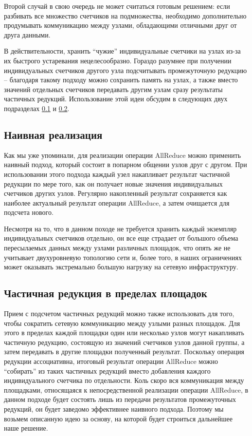 \documentclass{article}
\theoremstyle{plain}
\theoremstyle{plain}
\theoremstyle{plain}
\theoremstyle{plain}
\theoremstyle{definition}
\theoremstyle{remark}
\theoremstyle{plain}
\begin{document}
Второй случай в свою очередь не может считаться готовым решением: если разбивать все множество счетчиков на подмножества, необходимо дополнительно продумывать коммуникацию между узлами, обладающими отличными друг от друга данными.

В действительности, хранить \enquote{чужие} индивидуальные счетчики на узлах из-за их быстрого устаревания нецелесообразно. Гораздо разумнее при получении индивидуальных счетчиков другого узла подсчитывать промежуточную редукцию -- благодаря такому подходу можно сохранить память на узлах, а также вместо значений отдельных счетчиков передавать другим узлам сразу результаты частичных редукций. Использование этой идеи обсудим в следующих двух подразделах \ref{NaiveImplementationSubsection} и \ref{GroupReductionSubsection}.

\subsection{Наивная реализация}
\label{NaiveImplementationSubsection}

Как мы уже упоминали, для реализации операции AllReduce можно применить наивный подход, который состоит в попарном общении узлов друг с другом. При использовании этого подхода каждый узел накапливает результат частичной редукции по мере того, как он получает новые значения индивидуальных счетчиков других узлов. Регулярно накопленный результат сохраняется как наиболее актуальный результат операции AllReduce, а затем очищается для подсчета нового.

Несмотря на то, что в данном походе не требуется хранить каждый экземпляр индивидуальных счетчиков отдельно, он все еще страдает от большого объема пересылаемых данных между узлами различных площадок, что опять же не учитывает двухуровневую топологию сети и, более того, в наших ограничениях может оказывать экстремально большую нагрузку на сетевую инфраструктуру.

\subsection{Частичная редукция в пределах площадок}
\label{GroupReductionSubsection}

Прием с подсчетом частичных редукций можно также использовать для того, чтобы сократить сетевую коммуникацию между узлыми разных площадок. Для этого в пределах каждой площадки один или несколько узлов могут накапливать частичную редукцию, состоящую из значений счетчиков узлов данной группы, а затем передавать в другие площадки полученный результат. Поскольку операция редукции ассоциативна, итоговый результат операции AllReduce можно \enquote{собирать} из таких частичных редукций вместо добавления каждого индивидуального счетчика по отдельности. Коль скоро вся коммуникация между площадками, относящаяся к непосредственной реализации операции AllReduce, в данном подходе будет состоять лишь из передачи результатов промежуточных редукций, он будет заведомо эффективнее наивного подхода. Поэтому мы возьмем описанную идею за основу, на которой будет строиться дальнейшее наше решение.
\end{document}
